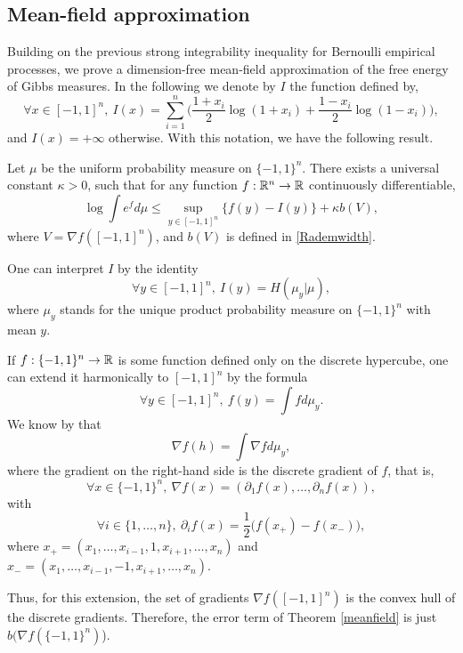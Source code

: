 \documentclass[a4paper,oneside,11pt]{article}
\begin{document}
\subsection{Mean-field approximation}
Building on the previous strong integrability inequality for Bernoulli empirical processes, we prove a dimension-free mean-field approximation of the free energy of Gibbs measures. In the following we denote by $I$ the function defined by,
\begin{equation} \label{defI} \forall x \in [-1,1]^n, \   I(x) =\sum_{i=1}^n \Big( \frac{1+x_i}{2} \log (1+x_i) + \frac{1-x_i}{2} \log (1-x_i)\Big),\end{equation}
and $I(x)= +\infty$ otherwise. With this notation, we have the following result.
\begin{The}\label{meanfield} Let $\mu$ be the uniform probability measure on $\{-1,1\}^n$. There exists a universal constant $\kappa>0$, such that 
for any function $f : \mathbb{R}^n \to \mathbb{R}$  continuously differentiable,
$$ \log \int e^f d \mu \leq \sup_{ y\in [-1,1]^n } \{ f(y) - I(y) \} + \kappa b(V),$$
where $V = \nabla f([-1,1]^n)$, and $b(V)$ is defined in \eqref{Rademwidth}.
\end{The}
 One can interpret $I$ by the identity
$$\forall y \in [-1,1]^n, \  I(y) = H(\mu_y|\mu),$$
where $\mu_y$ stands for the unique product probability measure on $\{-1,1\}^n$ with mean $y$.
\begin{Rem}\label{harmoext}
If $f : \{-1,1\}^n \to \mathbb{R}$ is some function defined only on the discrete hypercube, one can extend it harmonically to $[-1,1]^n$ by the formula
$$\forall y \in [-1,1]^n, \  f(y) = \int f d\mu_y.$$
We know by \cite[Fact 14]{Eldan} that
 $$ \nabla f(h) = \int \nabla f d \mu_y,$$
where the gradient on the right-hand side is the discrete gradient of $f$, that is,
$$\forall x \in \{-1,1\}^n,\    \nabla f(x) = (\partial_1 f(x),\ldots,\partial_n f(x)),$$
with 
$$\forall i \in \{1,\ldots,n\}, \ \partial_i f(x) = \frac{1}{2} \big( f(x_+) - f(x_-)\big),$$
where $x_+ = (x_1,\ldots ,x_{i-1},1,x_{i+1},\ldots ,x_n)$ and $x_- = (x_1,\ldots ,x_{i-1},-1,x_{i+1},\ldots,x_n)$.  

Thus, for this extension, the set of gradients 
$\nabla f([-1,1]^n)$ is the convex hull of the discrete gradients. Therefore, the error term of Theorem \ref{meanfield} is just $b(\nabla f(\{-1,1\}^n)$).

\end{Rem}
\end{document}
